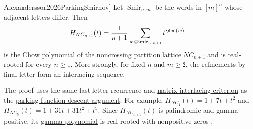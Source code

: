 \begin{theorem}[Alexandersson,
\cite[Thms.~1.1 and 4.2]{Alexandersson2026ParkingSmirnov}]
\label{noncrossingChowPolynomial}
Let $\operatorname{Smir}_{n,m}$ be the words in $[m]^n$ whose adjacent letters
differ.  Then
\[
 H_{NC_{n+1}}(t)=\frac{1}{n+1}
 \sum_{w\in\operatorname{Smir}_{n,n+1}}t^{\des(w)}
\]
is the Chow polynomial of the noncrossing partition lattice $NC_{n+1}$ and is
real-rooted for every $n\geq1$.  More strongly, for fixed $n$ and $m\geq2$,
the refinements by final letter form an interlacing sequence.
\end{theorem}
The proof uses the same last-letter recurrence and
\hyperref[matrixPreservesInterlacingSequences]{matrix interlacing criterion}
as the \hyperref[parkingFunctionDescentsRealRooted]{parking-function descent
argument}.  For example, $H_{NC_4}(t)=1+7t+t^2$ and
$H_{NC_5}(t)=1+31t+31t^2+t^3$.  Since $H_{NC_{n+1}}(t)$ is
palindromic and gamma-positive, its
\hyperref[gammaPolynomial]{gamma-polynomial} is real-rooted with
nonpositive zeros \cite[Cor.~4.4]{Alexandersson2026ParkingSmirnov}.
